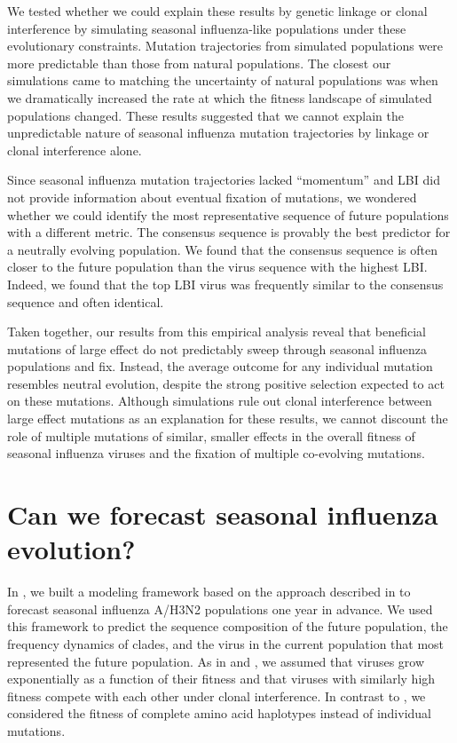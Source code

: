 We tested whether we could explain these results by genetic linkage or clonal interference by simulating seasonal influenza-like populations under these evolutionary constraints.
Mutation trajectories from simulated populations were more predictable than those from natural populations.
The closest our simulations came to matching the uncertainty of natural populations was when we dramatically increased the rate at which the fitness landscape of simulated populations changed.
These results suggested that we cannot explain the unpredictable nature of seasonal influenza mutation trajectories by linkage or clonal interference alone.

Since seasonal influenza mutation trajectories lacked ``momentum'' and LBI did not provide information about eventual fixation of mutations, we wondered whether we could identify the most representative sequence of future populations with a different metric.
The consensus sequence is provably the best predictor for a neutrally evolving population.
We found that the consensus sequence is often closer to the future population than the virus sequence with the highest LBI.
Indeed, we found that the top LBI virus was frequently similar to the consensus sequence and often identical.

Taken together, our results from this empirical analysis reveal that beneficial mutations of large effect do not predictably sweep through seasonal influenza populations and fix.
Instead, the average outcome for any individual mutation resembles neutral evolution, despite the strong positive selection expected to act on these mutations.
Although simulations rule out clonal interference between large effect mutations as an explanation for these results, we cannot discount the role of multiple mutations of similar, smaller effects in the overall fitness of seasonal influenza viruses and the fixation of multiple co-evolving mutations.

\section{Can we forecast seasonal influenza evolution?}

In \citet{Huddleston2020}, we built a modeling framework based on the approach described in \citet{Luksza:2014hj} to forecast seasonal influenza A/H3N2 populations one year in advance.
We used this framework to predict the sequence composition of the future population, the frequency dynamics of clades, and the virus in the current population that most represented the future population.
As in \citet{Barrat-Charlaix2020} and \citet{Luksza:2014hj}, we assumed that viruses grow exponentially as a function of their fitness and that viruses with similarly high fitness compete with each other under clonal interference.
In contrast to \citet{Barrat-Charlaix2020}, we considered the fitness of complete amino acid haplotypes instead of individual mutations.

